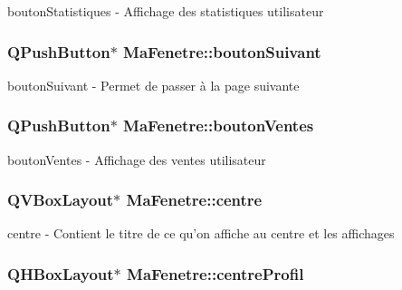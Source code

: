 bouton\-Statistiques -\/ Affichage des statistiques utilisateur 

\hypertarget{class_ma_fenetre_a54110f455a71febc15224b68470dd80e}{
\subsubsection[{bouton\-Suivant}]{\setlength{\rightskip}{0pt plus 5cm}Q\-Push\-Button$\ast$ Ma\-Fenetre\-::bouton\-Suivant\hspace{0.3cm}{\ttfamily [protected]}}}\label{class_ma_fenetre_a54110f455a71febc15224b68470dd80e}


bouton\-Suivant -\/ Permet de passer à la page suivante 

\hypertarget{class_ma_fenetre_a9399bb35a8e0a832597a2f3cb4e8dea3}{
\subsubsection[{bouton\-Ventes}]{\setlength{\rightskip}{0pt plus 5cm}Q\-Push\-Button$\ast$ Ma\-Fenetre\-::bouton\-Ventes\hspace{0.3cm}{\ttfamily [protected]}}}\label{class_ma_fenetre_a9399bb35a8e0a832597a2f3cb4e8dea3}


bouton\-Ventes -\/ Affichage des ventes utilisateur 

\hypertarget{class_ma_fenetre_aefa40adcb6099816353c31ea230ec1af}{
\subsubsection[{centre}]{\setlength{\rightskip}{0pt plus 5cm}Q\-V\-Box\-Layout$\ast$ Ma\-Fenetre\-::centre\hspace{0.3cm}{\ttfamily [protected]}}}\label{class_ma_fenetre_aefa40adcb6099816353c31ea230ec1af}


centre -\/ Contient le titre de ce qu'on affiche au centre et les affichages 

\hypertarget{class_ma_fenetre_a6e267fbdcd8da190e956c593664587c6}{
\subsubsection[{centre\-Profil}]{\setlength{\rightskip}{0pt plus 5cm}Q\-H\-Box\-Layout$\ast$ Ma\-Fenetre\-::centre\-Profil\hspace{0.3cm}{\ttfamily [protected]}}}\label{class_ma_fenetre_a6e267fbdcd8da190e956c593664587c6}


